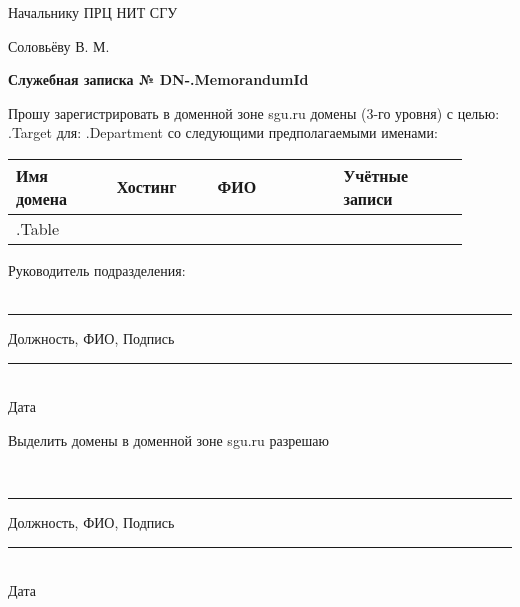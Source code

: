 \documentclass[12pt]{article}
\begin{document}
\begin{flushright}
Начальнику ПРЦ НИТ СГУ

Соловьёву В. М. \\[50pt]
\end{flushright}

\begin{center}
\large
\textbf{Служебная записка № DN-{{.MemorandumId}} } \\[20pt]
\end{center}
\begin{flushleft}
\large
Прошу зарегистрировать в доменной зоне sgu.ru домены (3-го уровня) с целью: {{.Target}} для: {{.Department}} со следующими предполагаемыми именами:
\end{flushleft}




\begin{table}[!h]
\large
\centering
\label{my-label}
\begin{tabular}{|p{0.20\linewidth}|p{0.20\linewidth}|p{0.25\linewidth}|p{0.25\linewidth}|}
\hline
Имя домена & Хостинг & ФИО & Учётные записи \\
\hline
{{.Table}}
\end{tabular}
\end{table}

\normalsize
\begin{flushleft}
\large
Руководитель подразделения:\\~\\
\end{flushleft}
\centering
\noindent\rule{550pt}{0.4pt}
\large
Должность, ФИО, Подпись\\[50pt]

\begin{flushright}
\normalsize
\noindent\rule{100pt}{0.4pt} \\
Дата           
\end{flushright}

\begin{flushleft}
Выделить домены в доменной зоне sgu.ru разрешаю
\end{flushleft}
 
\\

\centering
\noindent\rule{550pt}{0.4pt}
\large
Должность, ФИО, Подпись\\[50pt]

\begin{flushright}
\normalsize
\noindent\rule{100pt}{0.4pt} \\
Дата           
\end{flushright}
\end{document}
